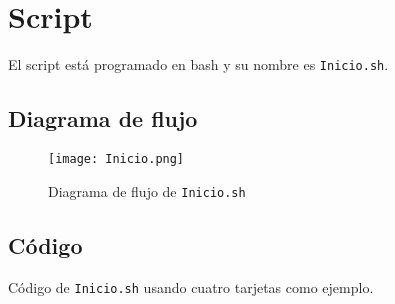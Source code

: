 \documentclass[12pt,letterpaper]{article}
\begin{document}
\section{Script}
El script está programado en bash y su nombre es \texttt{Inicio.sh}.

\newpage
\subsection{Diagrama de flujo}
\begin{figure}[h]
	\centering
	\texttt{[image: Inicio.png]}
	\caption{Diagrama de flujo de \texttt{Inicio.sh}}
	\label{Diagram de flujo de Inicio.sh}
\end{figure}

\newpage
\subsection{Código}

\begin{center}
	Código de \texttt{Inicio.sh} usando cuatro tarjetas como ejemplo.
\end{center}
\end{document}
